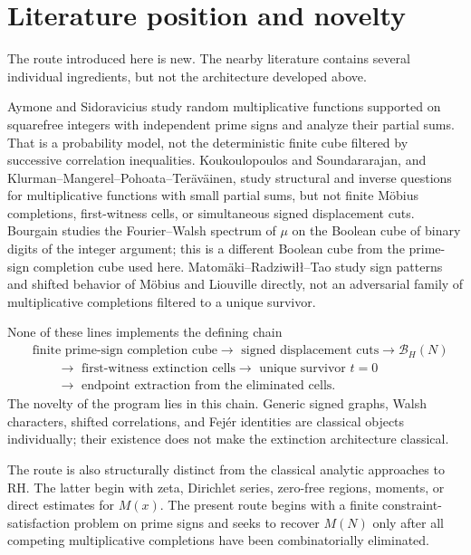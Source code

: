 \documentclass[11pt]{article}
\theoremstyle{definition}
\theoremstyle{remark}
\newcommand{\BH}{\mathcal B}
\begin{document}
\section{Literature position and novelty}

The route introduced here is new.  The nearby literature contains several individual ingredients, but not the architecture developed above.

Aymone and Sidoravicius study random multiplicative functions supported on squarefree integers with independent prime signs and analyze their partial sums.  That is a probability model, not the deterministic finite cube filtered by successive correlation inequalities.  Koukoulopoulos and Soundararajan, and Klurman--Mangerel--Pohoata--Ter\"av\"ainen, study structural and inverse questions for multiplicative functions with small partial sums, but not finite M\"obius completions, first-witness cells, or simultaneous signed displacement cuts.  Bourgain studies the Fourier--Walsh spectrum of $\mu$ on the Boolean cube of binary digits of the integer argument; this is a different Boolean cube from the prime-sign completion cube used here.  Matom\"aki--Radziwi\l\l--Tao study sign patterns and shifted behavior of M\"obius and Liouville directly, not an adversarial family of multiplicative completions filtered to a unique survivor.

None of these lines implements the defining chain
\[
\boxed{
\begin{aligned}
&\text{finite prime-sign completion cube}
\to\text{ signed displacement cuts}
\to\BH_H(N)\\
&\qquad\to\text{ first-witness extinction cells}
\to\text{ unique survivor }t=0\\
&\qquad\to\text{ endpoint extraction from the eliminated cells}.
\end{aligned}
}
\]
The novelty of the program lies in this chain.  Generic signed graphs, Walsh characters, shifted correlations, and Fej\'er identities are classical objects individually; their existence does not make the extinction architecture classical.

The route is also structurally distinct from the classical analytic approaches to RH.  The latter begin with zeta, Dirichlet series, zero-free regions, moments, or direct estimates for $M(x)$.  The present route begins with a finite constraint-satisfaction problem on prime signs and seeks to recover $M(N)$ only after all competing multiplicative completions have been combinatorially eliminated.
\end{document}
